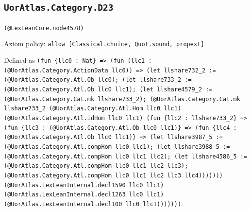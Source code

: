 \documentclass[11pt]{article}
\begin{document}
\subsection*{\texttt{UorAtlas.Category.D23}}
\noindent\texttt{(@LexLeanCore.node4578)}\par
\noindent Axiom policy: \texttt{allow [Classical.choice, Quot.sound, propext]}.\par
\noindent Defined as \texttt{(fun \{llc0 : Nat\} => (fun (llc1 : (@UorAtlas.Category.ActionData llc0)) => (let llshare732\_2 := (@UorAtlas.Category.Atl.Ob llc0); (let llshare733\_2 := (@UorAtlas.Category.Atl.Ob llc0 llc1); (let llshare4579\_2 := (@UorAtlas.Category.Cat.mk llshare733\_2); (@UorAtlas.Category.Cat.mk llshare733\_2 (@UorAtlas.Category.Atl.Hom llc0 llc1) (@UorAtlas.Category.Atl.idHom llc0 llc1) (fun \{llc2 : llshare733\_2\} => (fun \{llc3 : (@UorAtlas.Category.Atl.Ob llc0 llc1)\} => (fun \{llc4 : (@UorAtlas.Category.Atl.Ob llc0 llc1)\} => (let llshare3987\_5 := (@UorAtlas.Category.Atl.compHom llc0 llc1); (let llshare3988\_5 := (@UorAtlas.Category.Atl.compHom llc0 llc1 llc2); (let llshare4586\_5 := (@UorAtlas.Category.Atl.compHom llc0 llc1 llc2 llc3); (@UorAtlas.Category.Atl.compHom llc0 llc1 llc2 llc3 llc4))))))) (@UorAtlas.LexLeanInternal.decl1590 llc0 llc1) (@UorAtlas.LexLeanInternal.decl1263 llc0 llc1) (@UorAtlas.LexLeanInternal.decl100 llc0 llc1)))))))}.\par
\end{document}
